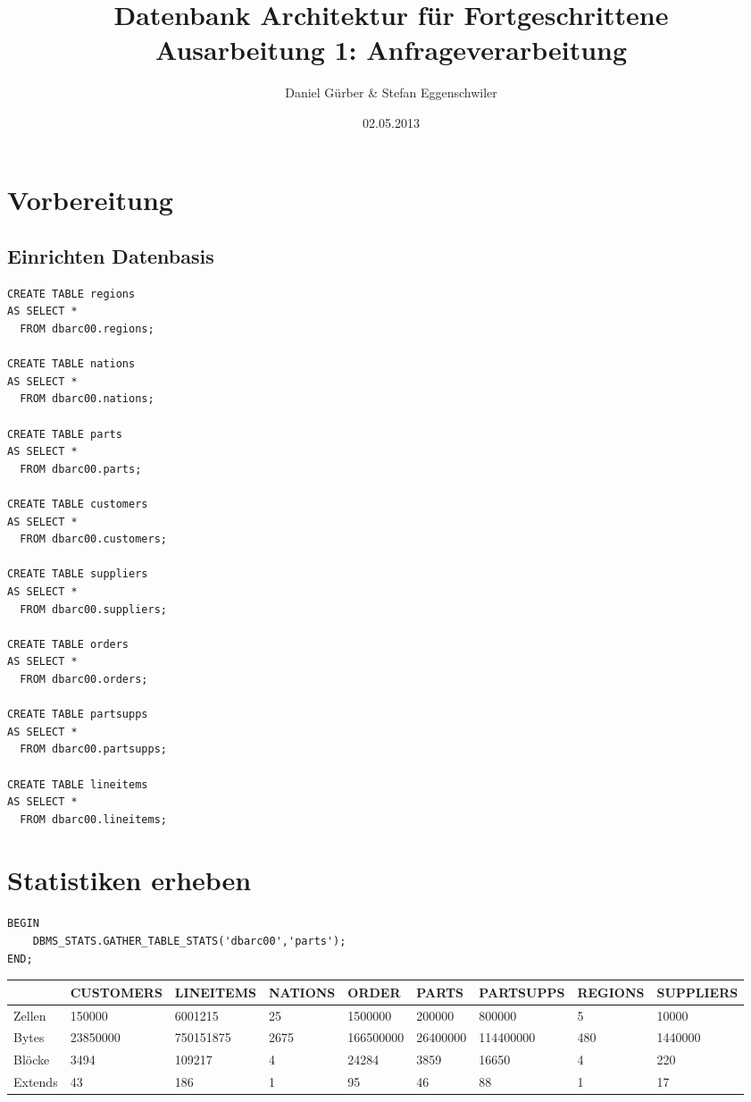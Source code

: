 \documentclass[10pt]{article}
\title{
\vspace{4cm}
\huge{Datenbank Architektur für Fortgeschrittene}\\
\vspace{0.2cm}
\Large{Ausarbeitung 1: Anfrageverarbeitung}\\
}
\author{Daniel Gürber & Stefan Eggenschwiler}
\date{02.05.2013}
\begin{document}
\maketitle
\thispagestyle{fancy}

\newpage

\tableofcontents	


\newpage
\setcounter{page}{1}


\section{Vorbereitung}
\subsection{Einrichten Datenbasis}
\begin{lstlisting}[style=sql]
CREATE TABLE regions
AS SELECT *
  FROM dbarc00.regions;
  
CREATE TABLE nations
AS SELECT *
  FROM dbarc00.nations;

CREATE TABLE parts
AS SELECT *
  FROM dbarc00.parts;
  
CREATE TABLE customers
AS SELECT *
  FROM dbarc00.customers;

CREATE TABLE suppliers
AS SELECT *
  FROM dbarc00.suppliers;

CREATE TABLE orders
AS SELECT *
  FROM dbarc00.orders;

CREATE TABLE partsupps
AS SELECT *
  FROM dbarc00.partsupps;

CREATE TABLE lineitems
AS SELECT *
  FROM dbarc00.lineitems;
\end{lstlisting}

\section{Statistiken erheben}
\begin{lstlisting}[style=sql]
BEGIN
	DBMS_STATS.GATHER_TABLE_STATS('dbarc00','parts');
END;
\end{lstlisting}
{\footnotesize
\begin{tabular}{|l|l|l|l|l|l|l|l|l|}
\hline
 & CUSTOMERS & LINEITEMS & NATIONS & ORDER & PARTS & PARTSUPPS & REGIONS & SUPPLIERS \\
\hline
\hline
Zellen & 150000 & 6001215 & 25 & 1500000 & 200000 & 800000 & 5 & 10000 \\
\hline
Bytes & 23850000 & 750151875 & 2675 & 166500000 & 26400000 & 114400000 & 480 & 1440000 \\
\hline
Blöcke & 3494 & 109217 & 4 & 24284 & 3859 & 16650 & 4 & 220 \\
\hline
Extends & 43 & 186 & 1 & 95 & 46 & 88 & 1 & 17 \\
\hline
\end{tabular}
}
\end{document}
